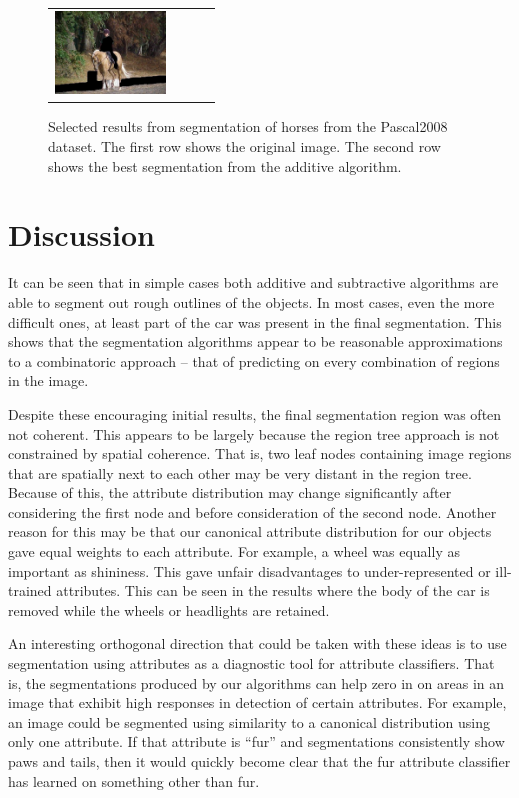 \documentclass[10pt,twocolumn,letterpaper]{article}
\begin{document}
\begin{figure}[p]
\begin{tabular}{ p{3cm} p{3cm} p{3cm} p{3cm} }
\includegraphics[width=2.95cm]{figures/add_res/horse/2008_004470.jpg_3_bad.jpg.eps} \\
\end{tabular}
\caption{Selected results from segmentation of horses from the Pascal2008
dataset.  The first row shows the original image.  The second row shows
the best segmentation from the additive algorithm.}
\label{fig:horse_bad_results}
\end{figure}


\section{Discussion}
\label{sec:discussion}

It can be seen that in simple cases both additive and subtractive algorithms
are able to segment out rough outlines of the objects.  In most cases, even
the more difficult ones, at least part of the car was present in the final
segmentation.  This shows that the segmentation algorithms appear to be
reasonable approximations to a combinatoric approach -- that of predicting
on every combination of regions in the image.

Despite these encouraging initial results, the final segmentation region
was often not coherent.
This appears to be largely because the region tree approach is not
constrained by spatial coherence.  That is, two leaf nodes containing image
regions that are spatially next to each other may be very distant in the
region tree.  Because of this, the attribute distribution may change significantly
after considering the first node and before consideration of the second node.
Another reason for this may be that our canonical attribute distribution for
our objects gave equal weights to each attribute.  For example, a wheel was
equally as important as shininess.  This gave unfair disadvantages to
under-represented or ill-trained attributes.  This can be seen in the results
where the body of the car is removed while the wheels or headlights are
retained.

An interesting orthogonal direction that could be taken with these ideas is to
use segmentation using attributes as a diagnostic tool for attribute classifiers.
That is, the segmentations produced by our algorithms can help zero in on areas
in an image that exhibit high responses in detection of certain attributes.
For example, an image could be segmented using similarity to a canonical distribution
using only one attribute.  If that attribute is ``fur'' and segmentations
consistently show paws and tails, then it would quickly become clear that
the fur attribute classifier has learned on something other than fur.
\end{document}
